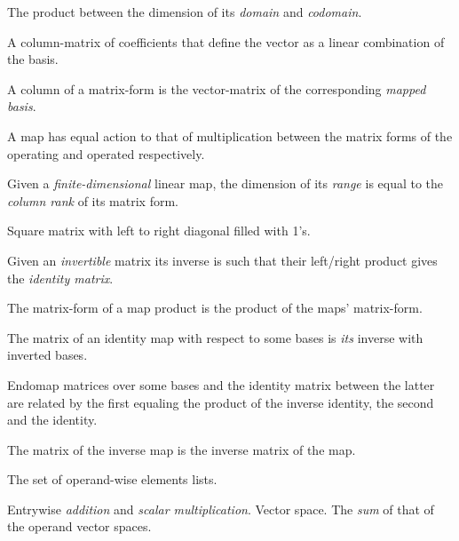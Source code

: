 \begin{multicols}{3}
  The product between the dimension of its \textit{domain} and \textit{codomain}.

  A column-matrix of coefficients that define the vector as a linear combination of the basis.

  A column of a matrix-form is the vector-matrix of the corresponding \textit{mapped basis}.
  
  A map has equal action to that of multiplication between the matrix forms of the operating and operated respectively.
  
  Given a \textit{finite-dimensional} linear map,
  the dimension of its \textit{range} is equal to
  the \textit{column rank} of its matrix form.
  
  Square matrix with left to right diagonal filled with 1's.

  Given an \textit{invertible} matrix its inverse is such that their left/right product gives the \textit{identity matrix}.

  The matrix-form of a map product is the product of the maps' matrix-form.
  
  The matrix of an identity map with respect to some bases is
  \textit{its} inverse with inverted bases.
  
  Endomap matrices over some bases and the identity matrix between the latter
  are related by the first equaling the product of the inverse identity, the
  second and the identity.
    
  The matrix of the inverse map is the inverse matrix of the map.

  The set of operand-wise elements lists.

  Entrywise \textit{addition} and \textit{scalar multiplication}.
   Vector space.
  The \textit{sum} of that of the operand vector spaces.


\end{multicols}
